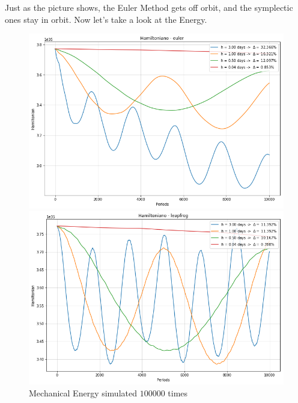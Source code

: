 \documentclass[12pt]{article}
\begin{document}
Just as the picture shows, the Euler Method gets off orbit, and the symplectic ones stay in orbit.
Now let's take a look at the Energy.
\begin{figure}[H]
  \includegraphics[width=.92\textwidth, height =.5\textheight]{h_euler.png}

  \includegraphics[width=.92\textwidth, height =.5\textheight]{h_leap.png}
  \caption{Mechanical Energy simulated \(100000\) times}
  \label{Euler Method}
\end{figure}
\end{document}
